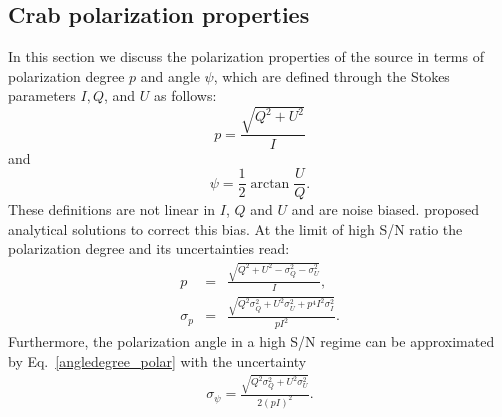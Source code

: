 \documentclass[twocolumn,traditabstract]{aa}
\begin{document}



\subsection{Crab polarization properties}\label{sec:pol_properties}
In this section we discuss the polarization properties of the source in terms of polarization degree $p$ and angle $\psi$, which are defined through the Stokes parameters $I, Q$, and $U$ as follows:
\begin{equation}
 p    = \frac{\sqrt{Q^2 + U^2}}{I} \nonumber 
\end{equation}
and
 \begin{equation}
 \psi = \frac{1}{2}\arctan\frac{U}{Q}.\label{angledegree_polar}
 \end{equation}
These definitions are not linear in $I$, $Q$ and $U$ and are noise biased. 
\citet{1980A&A....91...97S,1985A&A...142..100S,montier} proposed analytical solutions to correct this bias. At the limit of high S/N ratio the polarization degree and its uncertainties read:
 \begin{eqnarray}
 p    &=& \frac{\sqrt{Q^2 + U^2 - \sigma_{Q}^2 - \sigma_{U}^2}}{I}, \nonumber \\ 
  \sigma_{p} &=& \frac{\sqrt{Q^2\sigma_Q^2 + U^2\sigma_U^2 + p^4I^2\sigma_I^2}}{pI^2}.
  \label{p_true_degree}
 \end{eqnarray}
 Furthermore, the polarization angle in a high S/N regime can be approximated by Eq.~\ref{angledegree_polar} with the uncertainty
  \begin{eqnarray}\label{angle_uncertainty}
  \sigma_{\psi} = \frac{\sqrt{Q^2\sigma_Q^2 + U^2\sigma_U^2}}{2(pI)^2}.
  \end{eqnarray}
\end{document}
